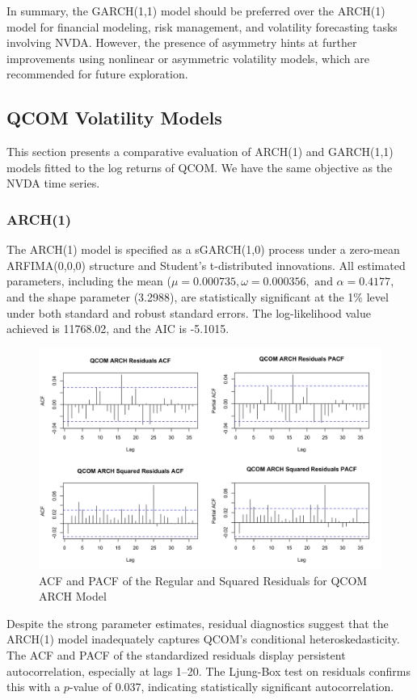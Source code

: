 \documentclass[12pt]{article}
\begin{document}
In summary, the GARCH(1,1) model should be preferred over the ARCH(1) model for financial modeling, risk management, and volatility forecasting tasks involving NVDA. However, the presence of asymmetry hints at further improvements using nonlinear or asymmetric volatility models, which are recommended for future exploration.

\subsection*{QCOM Volatility Models}

This section presents a comparative evaluation of ARCH(1) and GARCH(1,1) models fitted to the log returns of QCOM. We have the same objective as the NVDA time series.

\subsubsection*{ARCH(1)}

The ARCH(1) model is specified as a sGARCH(1,0) process under a zero-mean ARFIMA(0,0,0) structure and Student’s t-distributed innovations. All estimated parameters, including the mean ($\mu = 0.000735, \omega=0.000356, \text{ and } \alpha =0.4177$, and the shape parameter (3.2988), are statistically significant at the 1\% level under both standard and robust standard errors. The log-likelihood value achieved is 11768.02, and the AIC is -5.1015.

\begin{figure}[!h]
	\centering
	\includegraphics[width=0.8\linewidth]{plots/ARCH_QCOM.png}
	\caption{ACF and PACF of the Regular and Squared Residuals for QCOM ARCH Model}
	\label{fig:nvda_garch}
\end{figure}

Despite the strong parameter estimates, residual diagnostics suggest that the ARCH(1) model inadequately captures QCOM’s conditional heteroskedasticity. The ACF and PACF of the standardized residuals display persistent autocorrelation, especially at lags 1–20. The Ljung-Box test on residuals confirms this with a $p$-value of 0.037, indicating statistically significant autocorrelation.
\end{document}
